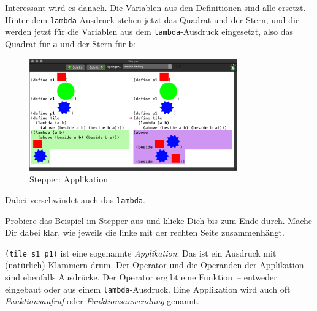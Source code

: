 %
\noindent Interessant wird es danach. Die Variablen aus den Definitionen sind
alle ersetzt.  Hinter dem \texttt{lambda}-Ausdruck stehen jetzt das
Quadrat und der Stern, und die werden jetzt für die Variablen aus dem
\texttt{lambda}-Ausdruck eingesetzt, also das Quadrat für \texttt{a}
und der Stern für \texttt{b}:
%
\begin{figure}[H]
  \centering
  \includegraphics[width=0.8\textwidth]{i1prog/stepper-3}
  \caption{Stepper: Applikation}
  \label{fig:stepper-3}
\end{figure}
%
\noindent Dabei verschwindet auch das \texttt{lambda}.
%
\begin{aufgabeinline}
  Probiere das Beispiel im Stepper aus und klicke Dich bis zum Ende
  durch. Mache Dir dabei klar, wie jeweils die linke mit der rechten
  Seite zusammenhängt.
\end{aufgabeinline}
%
\texttt{(tile s1 p1)} ist eine sogenannte
\textit{Applikation}: Das ist ein Ausdruck mit
(natürlich) Klammern drum.  Der Operator und die Operanden der
Applikation sind ebenfalls Ausdrücke.  Der Operator ergibt eine
Funktion~-- entweder eingebaut oder aus einem
\texttt{lambda}-Ausdruck.  Eine Applikation wird auch oft
\textit{Funktionsaufruf} oder
\textit{Funktionsanwendung} genannt.

